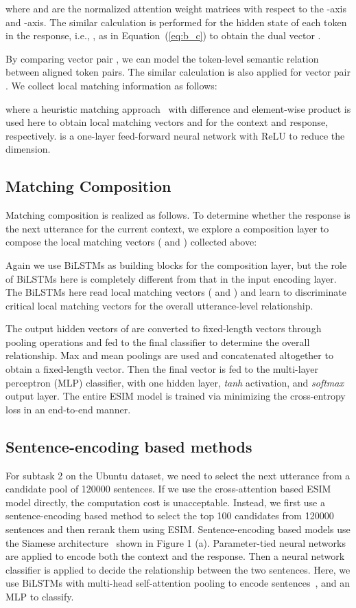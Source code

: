\documentclass[letterpaper]{article} \usepackage{aaai19}  \usepackage{times}  \usepackage{helvet}  \usepackage{courier}  \usepackage{url}  \usepackage{graphicx}
\begin{document}
\noindent where  and  are the normalized attention weight matrices with respect to the -axis and -axis. The similar calculation is performed for the hidden state of each token in the response, i.e., , 
as in
Equation~(\ref{eq:b_c}) to obtain the dual vector . 

By comparing vector pair , we can model the token-level semantic relation between aligned token pairs. The similar calculation is also applied for vector pair . We collect local matching information as follows:

\noindent where a heuristic matching approach~\cite{DBLP:conf/acl/MouMLX0YJ16} with difference and element-wise product is used here to obtain local matching vectors  and  for the context and response, respectively. 
 is a one-layer feed-forward neural network with ReLU to reduce the dimension. 

\subsection{Matching Composition}
Matching composition is realized as follows. To determine whether the response is the next utterance for the current context, we explore a composition layer to compose the local matching vectors ( and ) collected above:

Again we use BiLSTMs as building blocks for the composition layer, but the role of BiLSTMs here is completely different from that in the input encoding layer. The BiLSTMs here read local matching vectors ( and ) and learn to discriminate critical local matching vectors for the overall utterance-level relationship. 

The output hidden vectors of  are converted to fixed-length vectors through pooling operations and fed to the final classifier to determine the overall relationship. Max and mean poolings are used and concatenated altogether to obtain a fixed-length vector. Then the final vector is fed to the multi-layer perceptron (MLP) classifier, with one hidden layer, \textit{tanh} activation, and \textit{softmax} output layer. The entire ESIM model is trained via minimizing the cross-entropy loss in an end-to-end manner. 


\subsection{Sentence-encoding based methods}
For subtask 2 on the Ubuntu dataset, we need to select the next utterance from a candidate pool of 120000 sentences. If we use the cross-attention based ESIM model directly, the computation cost is unacceptable. Instead, we first use a sentence-encoding based method to select the top 100 candidates from 120000 sentences and then rerank them using ESIM. Sentence-encoding based models use the Siamese architecture~\cite{DBLP:conf/nips/BromleyGLSS93,DBLP:conf/repeval/ChenZLWJI17} shown in Figure 1 (a).  Parameter-tied neural networks are applied to encode both the context and the response. Then a neural network classifier is applied to decide the relationship between the two sentences. Here, we use BiLSTMs with multi-head self-attention pooling to encode sentences~\cite{DBLP:journals/corr/LinFSYXZB17,DBLP:conf/coling/ChenLZ18}, and an MLP to classify.
\end{document}
